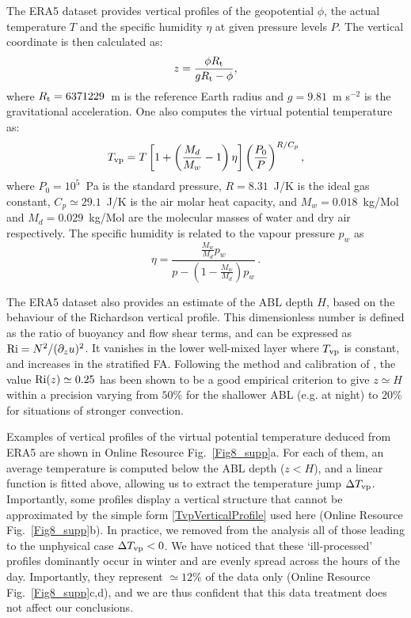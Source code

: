 The ERA5 dataset provides vertical profiles of the geopotential $\phi$, the actual temperature $T$ and the specific humidity $\eta$ at given pressure levels $P$. The vertical coordinate is then calculated as:
%
\begin{equation}
z = \frac{\phi R_{\textup{t}}}{g R_{\textup{t}} - \phi},
\end{equation}
%
where $R_{\textup{t}} = 6371229$~m is the reference Earth radius and $g = 9.81$~m s$^{-2}$ is the gravitational acceleration. One also computes the virtual potential temperature as:
%
\begin{equation}
T_{\textup{vp}} = T\left[1 + \left(\frac{M_d}{M_w} - 1\right) \eta \right] \left(\frac{P_{0}}{P}\right)^{R/C_p},
\end{equation}
%
where $P_{0} = 10^{5}$~Pa is the standard pressure, $R = 8.31$~J/K is the ideal gas constant, $C_p \simeq 29.1$~J/K is the air molar heat capacity, and $M_w = 0.018$~kg/Mol and $M_d = 0.029$~kg/Mol are the molecular masses of water and dry air respectively. The specific humidity is related to the vapour pressure $p_w$ as
%
\begin{equation}
\eta = \frac{\frac{M_w}{M_d} p_w}{p - \left( 1 - \frac{M_w}{M_d} \right) p_w} \, .
\end{equation}
%

The ERA5 dataset also provides an estimate of the ABL depth $H$, based on the behaviour of the Richardson vertical profile. This dimensionless number is defined as the ratio of buoyancy and flow shear terms, and can be expressed as $\textup{Ri} = N^2/(\partial_z u)^2$. It vanishes in the lower well-mixed layer where $T_{\textup{vp}}$ is constant, and increases in the stratified FA. Following the method and calibration of \citet{Vogelezang1996,seidel2012}, the value $\textup{Ri}(z) \simeq 0.25$ has been shown to be a good empirical criterion to give $z \simeq H$ within a precision varying from $50$\% for the shallower ABL (e.g. at night) to $20$\% for situations of stronger convection.

Examples of vertical profiles of the virtual potential temperature deduced from ERA5 are shown in Online Resource Fig.~\ref{Fig8_supp}a. For each of them, an average temperature is computed below the ABL depth ($z<H$), and a linear function is fitted above, allowing us to extract the temperature jump $\Delta T_{\textup{vp}}$. Importantly, some profiles display a vertical structure that cannot be approximated by the simple form \eqref{TvpVerticalProfile} used here (Online Resource Fig.~\ref{Fig8_supp}b). In practice, we removed from the analysis all of those leading to the unphysical case $\Delta T_{\textup{vp}}<0$. We have noticed that these `ill-processed' profiles dominantly occur in winter and are evenly spread across the hours of the day. Importantly, they represent $\simeq12$\% of the data only (Online Resource Fig.~\ref{Fig8_supp}c,d), and we are thus confident that this data treatment does not affect our conclusions.


